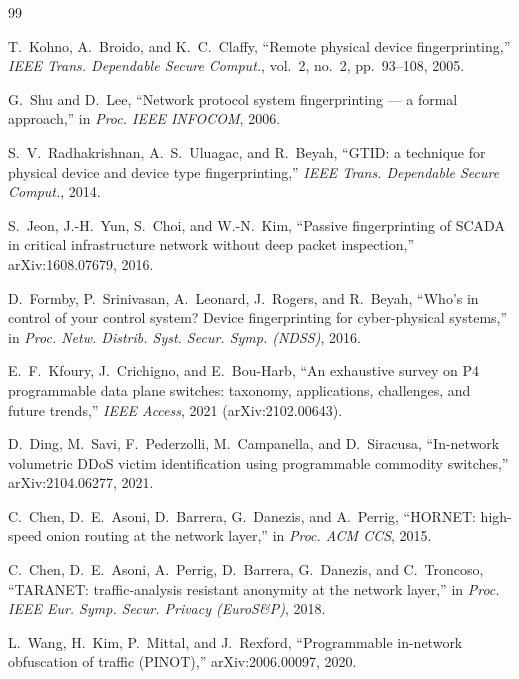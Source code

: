 \documentclass[10pt,a4paper,oneside]{article}
\begin{document}
\begin{thebibliography}{99}
\setlength{\itemsep}{0.15em}

 T.~Kohno, A.~Broido, and K.~C.~Claffy, ``Remote physical device
fingerprinting,'' \emph{IEEE Trans. Dependable Secure Comput.}, vol.~2, no.~2, pp.~93--108,
2005.

 G.~Shu and D.~Lee, ``Network protocol system fingerprinting --- a
formal approach,'' in \emph{Proc. IEEE INFOCOM}, 2006.

 S.~V.~Radhakrishnan, A.~S.~Uluagac, and R.~Beyah, ``{GTID}: a
technique for physical device and device type fingerprinting,'' \emph{IEEE Trans. Dependable
Secure Comput.}, 2014.

 S.~Jeon, J.-H.~Yun, S.~Choi, and W.-N.~Kim, ``Passive fingerprinting
of {SCADA} in critical infrastructure network without deep packet inspection,''
arXiv:1608.07679, 2016.

 D.~Formby, P.~Srinivasan, A.~Leonard, J.~Rogers, and R.~Beyah,
``Who's in control of your control system? Device fingerprinting for cyber-physical systems,''
in \emph{Proc. Netw. Distrib. Syst. Secur. Symp. (NDSS)}, 2016.

 E.~F.~Kfoury, J.~Crichigno, and E.~Bou-Harb, ``An exhaustive
survey on {P4} programmable data plane switches: taxonomy, applications, challenges, and future
trends,'' \emph{IEEE Access}, 2021 (arXiv:2102.00643).

 D.~Ding, M.~Savi, F.~Pederzolli, M.~Campanella, and D.~Siracusa,
``In-network volumetric {DDoS} victim identification using programmable commodity switches,''
arXiv:2104.06277, 2021.

 C.~Chen, D.~E.~Asoni, D.~Barrera, G.~Danezis, and A.~Perrig,
``{HORNET}: high-speed onion routing at the network layer,'' in \emph{Proc. ACM CCS}, 2015.

 C.~Chen, D.~E.~Asoni, A.~Perrig, D.~Barrera, G.~Danezis, and
C.~Troncoso, ``{TARANET}: traffic-analysis resistant anonymity at the network layer,'' in
\emph{Proc. IEEE Eur. Symp. Secur. Privacy (EuroS\&P)}, 2018.

 L.~Wang, H.~Kim, P.~Mittal, and J.~Rexford, ``Programmable in-network
obfuscation of traffic ({PINOT}),'' arXiv:2006.00097, 2020.


\end{thebibliography}
\end{document}
